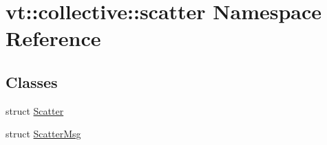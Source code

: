 \hypertarget{namespacevt_1_1collective_1_1scatter}{}\section{vt\+:\+:collective\+:\+:scatter Namespace Reference}
\label{namespacevt_1_1collective_1_1scatter}
\subsection*{Classes}
\begin{DoxyCompactItemize}
\item 
struct \hyperlink{structvt_1_1collective_1_1scatter_1_1_scatter}{Scatter}
\item 
struct \hyperlink{structvt_1_1collective_1_1scatter_1_1_scatter_msg}{Scatter\+Msg}
\end{DoxyCompactItemize}
